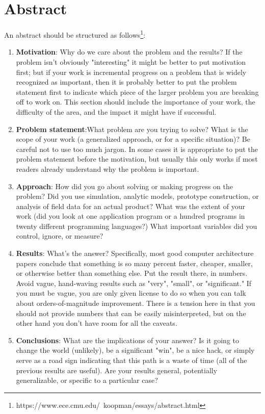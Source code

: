 \chapter*{Abstract}

An abstract should be structured as
follows\footnote{https://www.ece.cmu.edu/~koopman/essays/abstract.html}:

\begin{enumerate}
  \item \textbf{Motivation}: Why do we care about the problem and the results?
  If the problem isn't obviously "interesting" it might be better to put
  motivation first; but if your work is
  incremental progress on a problem that is widely recognized as important, then it is probably better to put the
  problem statement first to indicate which piece of the larger problem you are
  breaking off to work on. This section should include the importance of your
  work, the difficulty of the area, and the impact it might have if successful.
 

  \item \textbf{Problem statement}:What problem are you trying to solve? What is
  the scope of your work (a generalized approach, or for a specific situation)?
  Be careful not to use too much jargon. In some cases it is appropriate to put
  the problem statement before the motivation, but usually this only works if
  most readers already understand why the problem is important.

  \item \textbf{Approach}: How did you go about solving or making progress on
  the problem? Did you use simulation, analytic models, prototype construction,
  or analysis of field data for an actual product? What was the extent of your
  work (did you look at one application program or a hundred programs in twenty
  different programming languages?) What important variables did you control,
  ignore, or measure?

  \item \textbf{Results}: What's the answer? Specifically, most good computer
  architecture papers conclude that something is so many percent faster,
  cheaper, smaller, or otherwise better than something else. Put the result
  there, in numbers. Avoid vague, hand-waving results such as "very", "small",
  or "significant." If you must be vague, you are only given license to do so
  when you can talk about orders-of-magnitude improvement. There is a tension
  here in that you should not provide numbers that can be easily misinterpreted,
  but on the other hand you don't have room for all the caveats.

  \item \textbf{Conclusions}: What are the implications of your answer? Is it
  going to change the world (unlikely), be a significant "win", be a nice hack,
  or simply serve as a road sign indicating that this path is a waste of time
  (all of the previous results are useful). Are your results general,
  potentially generalizable, or specific to a particular case?
\end{enumerate}